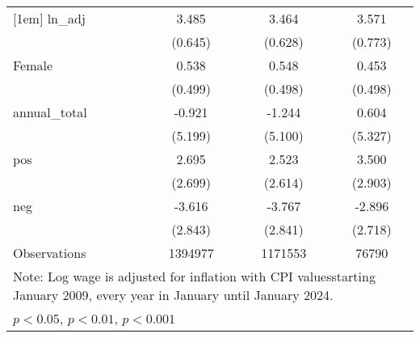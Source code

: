 \begin{table}[htbp]
\begin{tabular}{l*{3}{c}}
[1em]
ln\_adj              &       3.485         &       3.464         &       3.571         \\
                    &     (0.645)         &     (0.628)         &     (0.773)         \\
[1em]
Female              &       0.538         &       0.548         &       0.453         \\
                    &     (0.499)         &     (0.498)         &     (0.498)         \\
[1em]
annual\_total        &      -0.921         &      -1.244         &       0.604         \\
                    &     (5.199)         &     (5.100)         &     (5.327)         \\
[1em]
pos                 &       2.695         &       2.523         &       3.500         \\
                    &     (2.699)         &     (2.614)         &     (2.903)         \\
[1em]
neg                 &      -3.616         &      -3.767         &      -2.896         \\
                    &     (2.843)         &     (2.841)         &     (2.718)         \\
\hline
Observations        &     1394977         &     1171553         &       76790         \\
\hline\hline
\multicolumn{4}{l}{\footnotesize Note: Log wage is adjusted for inflation with CPI valuesstarting January 2009, every year in January until January 2024.}\\
\multicolumn{4}{l}{\footnotesize \sym{*} \(p<0.05\), \sym{**} \(p<0.01\), \sym{***} \(p<0.001\)}\\
\end{tabular}
\end{table}
